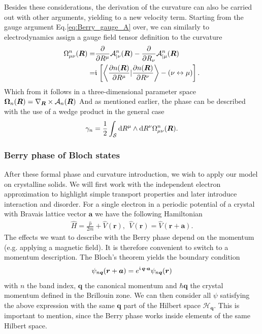 \documentclass[../main]{subfiles}
\begin{document}
    Besides these considerations, the derivation of the curvature can also be carried out with other arguments, yielding to a new velocity term. Starting from the gauge argument Eq.\ref{eq:Berry_gauge_A} over, we can similarly to 
    electrodynamics assign a gauge field tensor definition to the curvature \cite{Xiao2010-lt}
    \begin{align*}
        \Omega^n_{\mu\nu}(\bm{R}) =& \frac{\partial}{\partial R^{\mu}}\mathcal{A}^n_{|\nu}(\bm{R}) - \frac{\partial}{\partial R_{\nu}}\mathcal{A}^n_{|\mu}(\bm{R})\\
        =& \large\mathfrak{i}\hspace*{1.3pt}\normalsize\left[\left\langle \frac{\partial n(\bm{R})}{\partial R^{\mu}}|\frac{\partial n(\bm{R})}{\partial R^{\nu}}\right\rangle - (\nu\leftrightarrow\mu)\right]. 
    \end{align*}
     Which from it follows in a three-dimensional parameter space $\bm{\Omega}_n(\bm{R}) = \nabla_{\bm{R}}\times\mathcal{A}_n(\bm{R})$
    And as mentioned earlier, the phase can be described with the use of a wedge product in the general case
    \begin{align*}
        \gamma_n = \frac{1}{2}\int_{\mathcal{S}} \mathrm{d} R^{\mu}\wedge \mathrm{d} R^{\nu}\Omega^n_{\mu\nu}(\bm{R}).
    \end{align*}
   
    \subsubsection{Berry phase of Bloch states}
    After these formal phase and curvature introduction, we wish to apply our model on crystalline solids. We will first work with the independent electron approximation to highlight simple transport properties and later
    introduce interaction and disorder. For a single electron in a periodic potential of a crystal with Bravais lattice vector $\bm{a}$ we have the following Hamiltonian
    \begin{align*}
        \hat{H} = \frac{\hat{p}}{2m} + \hat{V}(\bm{r}), ~ ~\hat{V}(\bm{r}) = \hat{V}(\bm{r} + \bm{a}) .
    \end{align*}
    The effects we want to describe with the Berry phase depend on the momentum (e.g. applying a magnetic field). It is therefore convenient to switch to a momentum description.
    The Bloch's theorem yields the boundary condition
    \begin{align*}
        \psi_{n\bm{q}}(\bm{r}+\bm{a}) = e^{\large\mathfrak{i}\hspace*{1.3pt}\normalsize\bm{q}\cdot\bm{a}}\psi_{n\bm{q}}(\bm{r})
    \end{align*}
    with $n$ the band index, $\bm{q}$ the canonical momentum and $\hbar\bm{q}$ the crystal momentum defined in the Brillouin zone.
    We can then consider all $\psi$ satisfying the above expression with the same $\bm{q}$ part of the Hilbert space $\mathcal{H}_{\bm{q}}$.
    This is important to mention, since the Berry phase works inside elements of the same Hilbert space.
\end{document}
